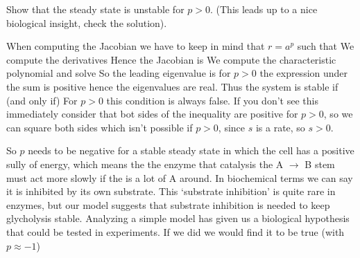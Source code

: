 \subquestion 
Show that the steady state is unstable for $p>0$. (This leads up to a nice biological insight, check the solution).

\solution
When computing the Jacobian we have to keep in mind that $r=a^p$ such that
We compute the derivatives 
Hence the Jacobian is 
We compute the characteristic polynomial
and solve 
So the leading eigenvalue is   
for $p>0$ the expression under the sum is positive hence the eigenvalues are real. Thus the system is stable if (and only if)
For $p>0$ this condition is always false. If you don't see this immediately consider that bot sides of the inequality are positive for $p>0$, so we can square both sides
which isn't possible if $p>0$, since $s$ is a rate, so $s>0$. 

So $p$ needs to be negative for a stable steady state in which the cell has a positive sully of energy, which means the the enzyme that catalysis the A $\rightarrow$ B stem must act more slowly if the is a lot of A around. In biochemical terms we can say it is inhibited by its own substrate. This `substrate inhibition' is quite rare in enzymes, but our model suggests that substrate inhibition is needed to keep glycholysis stable. Analyzing a simple model has given us a biological hypothesis that could be tested in experiments. If we did we would find it to be true (with $p\approx -1$)
